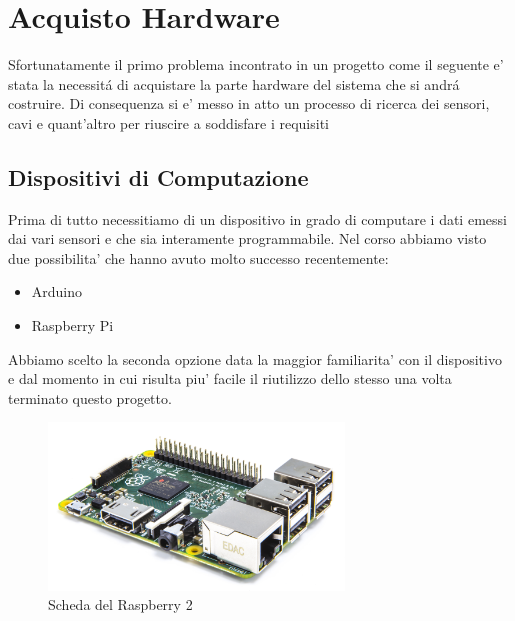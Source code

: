 \section{Acquisto Hardware}

Sfortunatamente il primo problema incontrato in un progetto come il seguente e' stata la necessit\'a di acquistare la parte hardware del sistema che si andr\' a costruire. Di consequenza si e' messo in atto un processo di ricerca dei sensori, cavi e quant'altro per riuscire a soddisfare i requisiti

\subsection{Dispositivi di Computazione}

Prima di tutto necessitiamo di un dispositivo in grado di computare i dati emessi dai vari sensori e che sia interamente programmabile. Nel corso abbiamo visto due possibilita' che hanno avuto molto successo recentemente:

\begin{itemize}
  \item Arduino
  \item Raspberry Pi
\end{itemize}

Abbiamo scelto la seconda opzione data la maggior familiarita' con il dispositivo e dal momento in cui risulta piu' facile il riutilizzo dello stesso una volta terminato questo progetto.

\begin{figure}
\centering
\includegraphics[width=0.7\textwidth,natwidth=4224,natheight=2394]{Figures/Sensors&Rasp/Pi2.jpeg}
\caption[raspberry]{Scheda del Raspberry 2}
\label{fig:Pi2}
\end{figure}




